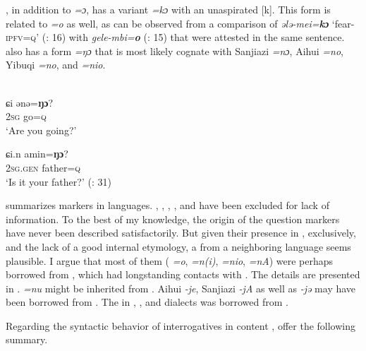 , in addition to \textit{=ɔ}, has a variant \textit{=kɔ} with an unaspirated [k]. This form is related to  \textit{=o} as well, as can be observed from a comparison of  \textit{əl}\textit{ə-mei=}\textbf{\textit{k}}\textbf{\textit{ɔ}} ‘fear-\textsc{ipfv}=\textsc{q}’ (\citealt{MuYejun1986}: 16) with  \textit{gele-mbi=}\textbf{\textit{o}} (\citealt{AixinjueluoYingsheng1987a}: 15) that were attested in the same sentence.  also has a form \textit{=ŋɔ} that is most likely cognate with Sanjiazi \textit{=nɔ}, Aihui  \textit{=no}, Yibuqi  \textit{=no}, and  \textit{=nio}.

\ea%
    \label{ex:tungu:78}
    \\
    \ea
    \gll ɕi ənə=\textbf{{ŋɔ}}?\\
    2\textsc{sg}    go=\textsc{q}\\
    \glt ‘Are you going?’
    
    \ex
    \gll ɕi.{n} amin=\textbf{{ŋɔ}}?\\
    2\textsc{sg}.\textsc{gen}  father=\textsc{q}\\
    \glt ‘Is it your father?’ (\citealt{MuYejun1987}: 31)
    \z
    \z

 summarizes  markers in  languages. , , , , and  have been excluded for lack of information. To the best of my knowledge, the origin of the  question markers have never been described satisfactorily. But given their presence in , exclusively, and the lack of a good internal etymology, a  from a neighboring language seems plausible. I argue that most of them ( \textit{=o}, \textit{=n(i)}, \textit{=nio}, \textit{=nA}) were perhaps borrowed from , which had longstanding contacts with . The details are presented in .  \textit{=nu} might be inherited from . Aihui  \textit{-je}, Sanjiazi  \textit{-jA} as well as  \textit{-jə} may have been borrowed from . The  in , , and  dialects was borrowed from .

Regarding the syntactic behavior of interrogatives in content , \cite[343f.]{MalchukovNedjalkov2010} offer the following summary.


